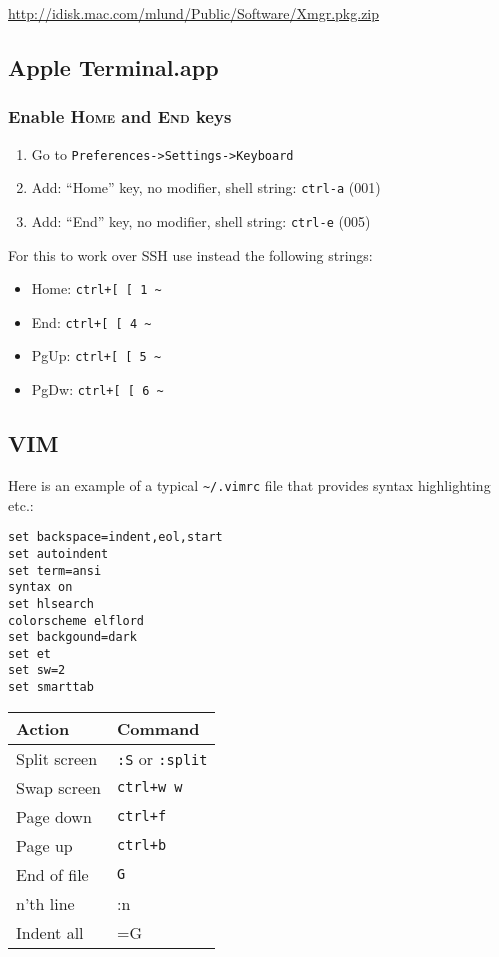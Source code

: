 \documentclass[a4paper,10pt]{article}
\begin{document}
\url{http://idisk.mac.com/mlund/Public/Software/Xmgr.pkg.zip}\\

\subsection{Apple Terminal.app}
\subsubsection{Enable \textsc{Home} and \textsc{End} keys}
\begin{enumerate}
\item Go to \verb"Preferences->Settings->Keyboard"
\item Add: ``Home'' key, no modifier, shell string: \verb"ctrl-a" (001)
\item Add: ``End'' key, no modifier, shell string: \verb"ctrl-e" (005)
\end{enumerate}
For this to work over SSH use instead the following strings:
\begin{itemize}
\item Home: \verb"ctrl+[ [ 1 ~"
\item End: \verb"ctrl+[ [ 4 ~"
\item PgUp: \verb"ctrl+[ [ 5 ~"
\item PgDw: \verb"ctrl+[ [ 6 ~"
\end{itemize}

\subsection{VIM}
Here is an example of a typical \verb"~/.vimrc" file that provides syntax highlighting etc.:
\begin{footnotesize}\begin{verbatim}
set backspace=indent,eol,start
set autoindent
set term=ansi
syntax on
set hlsearch
colorscheme elflord
set backgound=dark
set et
set sw=2
set smarttab
\end{verbatim}\end{footnotesize}
\begin{table}[h]
\begin{small}
\begin{tabular}{ll}\hline\hline
Action         & Command \\\hline
Split screen   & \verb":S" or \verb":split"\\
Swap screen    & \verb"ctrl+w w"\\
Page down      & \verb"ctrl+f"\\
Page up        & \verb"ctrl+b"\\
End of file    & \verb"G"\\
n'th line      & :n\\
Indent all     & =G\\
\hline
\end{tabular}\end{small}\end{table}
\end{document}
